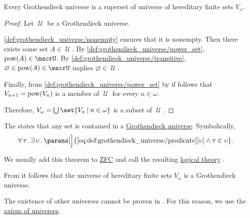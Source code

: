 \begin{lemma}\label{thm:grothendieck_universe_contains_finite_sets}
  Every Grothendieck universe is a superset of universe of hereditary finite sets \hyperref[def:universe_of_hereditary_finite_sets]{\( V_\omega \)}.
\end{lemma}
\begin{proof}
  Let \( \mscrU \) be a Grothendieck universe.

  \ref{def:grothendieck_universe/nonempty} ensures that it is nonempty. Then there exists some set \( A \in \mscrU \). By \ref{def:grothendieck_universe/power_set}, \( \pow(A) \in \mscrU \). By \ref{def:grothendieck_universe/transitive}, \( \varnothing \in \pow(A) \in \mscrU \) implies \( \varnothing \in \mscrU \).

  Finally, from \ref{def:grothendieck_universe/power_set} by  if follows that \( V_{n+1} = \operatorname{pow}(V_n) \) is a member of \( \mscrU \) for every \( n \in \omega \).

  Therefore, \( V_\omega = \bigcup \set{ V_n \given n \in \omega } \) is a subset of \( \mscrU \).
\end{proof}

\begin{definition}\label{def:axiom_of_universes}
  The  states that any set is contained in a \hyperref[def:grothendieck_universe]{Grothendieck universe}. Symbolically,
  \begin{equation}\label{eq:def:axiom_of_universes}
    \begin{aligned}
      \qforall \tau \qexists \upsilon \parens[\Big]{ \ref{eq:def:grothendieck_universe/predicate}[\upsilon] \wedge \tau \in \upsilon }.
    \end{aligned}
  \end{equation}

  We usually add this theorem to \hyperref[def:zfc]{ZFC} and call the resulting \hyperref[def:first_order_theory]{logical theory} .
\end{definition}

\begin{example}\label{ex:def:axiom_of_universes}
  From  it follows that the universe of hereditary finite sets \hyperref[def:universe_of_hereditary_finite_sets]{\( V_\omega \)} is a Grothendieck universe.

  The existence of other universes cannot be proven in . For this reason, we use the \hyperref[def:axiom_of_universes]{axiom of universes}.
\end{example}

